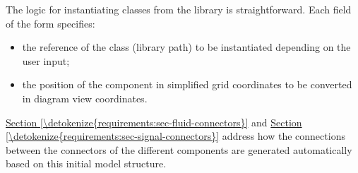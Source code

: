\documentclass[letterpaper,10pt, openany,english]{sphinxmanual}
\begin{document}
The logic for instantiating classes from the library is straightforward. Each field of the form specifies:
\begin{itemize}
\item {} 
the reference of the class (library path) to be instantiated depending on the user input;

\item {} 
the position of the component in simplified grid coordinates to be converted in diagram view coordinates.

\end{itemize}

\hyperref[\detokenize{requirements:sec-fluid-connectors}]{Section \ref{\detokenize{requirements:sec-fluid-connectors}}} and \hyperref[\detokenize{requirements:sec-signal-connectors}]{Section \ref{\detokenize{requirements:sec-signal-connectors}}} address how the connections between the connectors of the different components are generated automatically based on this initial model structure.
\end{document}
